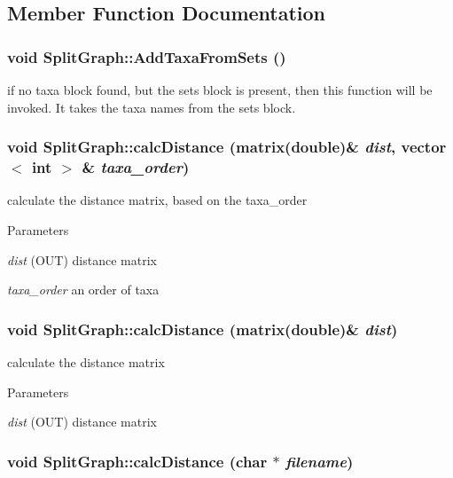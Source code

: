 \subsection{Member Function Documentation}
\hypertarget{classSplitGraph_adb64089273f29e935d82a5fc74289792}{
\subsubsection[{AddTaxaFromSets}]{\setlength{\rightskip}{0pt plus 5cm}void SplitGraph::AddTaxaFromSets ()}}
\label{classSplitGraph_adb64089273f29e935d82a5fc74289792}
if no taxa block found, but the sets block is present, then this function will be invoked. It takes the taxa names from the sets block. \hypertarget{classSplitGraph_a9e96c1c785114aa2fc0c998702345228}{
\subsubsection[{calcDistance}]{\setlength{\rightskip}{0pt plus 5cm}void SplitGraph::calcDistance (matrix(double)\& {\em dist}, \/  vector$<$ int $>$ \& {\em taxa\_\-order})}}
\label{classSplitGraph_a9e96c1c785114aa2fc0c998702345228}
calculate the distance matrix, based on the taxa\_\-order 
\begin{DoxyParams}{Parameters}
\item[{\em dist}](OUT) distance matrix \item[{\em taxa\_\-order}]an order of taxa \end{DoxyParams}
\hypertarget{classSplitGraph_a1cbeb318350af0d36f70b03ae11bd46d}{
\subsubsection[{calcDistance}]{\setlength{\rightskip}{0pt plus 5cm}void SplitGraph::calcDistance (matrix(double)\& {\em dist})}}
\label{classSplitGraph_a1cbeb318350af0d36f70b03ae11bd46d}
calculate the distance matrix 
\begin{DoxyParams}{Parameters}
\item[{\em dist}](OUT) distance matrix \end{DoxyParams}
\hypertarget{classSplitGraph_aff71095a191dc17326d6da9441496c37}{
\subsubsection[{calcDistance}]{\setlength{\rightskip}{0pt plus 5cm}void SplitGraph::calcDistance (char $\ast$ {\em filename})}}
